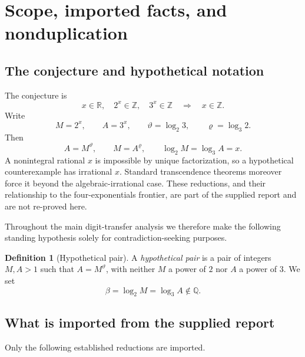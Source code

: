 \documentclass[11pt]{article}
\theoremstyle{definition}
\newtheorem{definition}[theorem]{Definition}
\newcommand{\Z}{\mathbb Z}
\newcommand{\Q}{\mathbb Q}
\newcommand{\R}{\mathbb R}
\begin{document}
\tableofcontents
\newpage

\section{Scope, imported facts, and nonduplication}

\subsection{The conjecture and hypothetical notation}

The conjecture is
\begin{equation}\label{eq:AE}
  x\in\R,\quad 2^x\in\Z,\quad 3^x\in\Z
  \quad\Longrightarrow\quad x\in\Z.
\end{equation}
Write
\begin{equation}\label{eq:MA-beta}
  M=2^x,\qquad A=3^x,
  \qquad \vartheta=\log_2 3,
  \qquad \varrho=\log_3 2.
\end{equation}
Then
\begin{equation}\label{eq:power-relation}
  A=M^\vartheta,\qquad M=A^\varrho,
  \qquad \log_2 M=\log_3 A=x.
\end{equation}
A nonintegral rational \(x\) is impossible by unique factorization, so a
hypothetical counterexample has irrational \(x\).  Standard transcendence
theorems moreover force it beyond the algebraic-irrational case.  These
reductions, and their relationship to the four-exponentials frontier, are
part of the supplied report and are not re-proved here.

Throughout the main digit-transfer analysis we therefore make the following
standing hypothesis solely for contradiction-seeking purposes.

\begin{definition}[Hypothetical pair]\label{def:hyp-pair}
A \emph{hypothetical pair} is a pair of integers \(M,A>1\) such that
\(A=M^\vartheta\), with neither \(M\) a power of \(2\) nor \(A\) a power of
\(3\).  We set
\[
  \beta=\log_2 M=\log_3 A\notin\Q.
\]
\end{definition}

\subsection{What is imported from the supplied report}

Only the following established reductions are imported.
\end{document}
